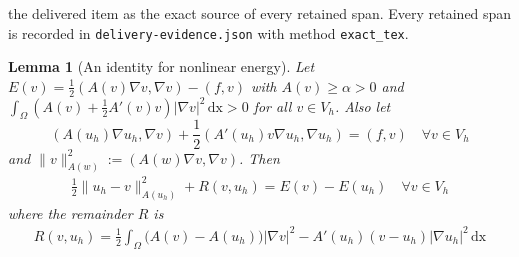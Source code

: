 \documentclass[10pt,a4paper]{amsart}
\theoremstyle{plain}
\newtheorem{lem}{Lemma}
\theoremstyle{definition}
\theoremstyle{remark}
\newcommand{\dx}{\,\text{dx}}
\begin{document}
the delivered item as the exact source of every retained span. Every retained span is recorded in \texttt{delivery-evidence.json} with method \texttt{exact\_tex}.
\begin{lem}[An identity for nonlinear energy]\label{lem:nonlinenergyident}
Let $E(v) = \frac{1}{2}(A(v) \nabla v,\nabla v) - (f, v)$ with $A(v) \geq \alpha > 0$ and $\int_{\Omega} (A(v) + \frac{1}{2}A'(v)v) |\nabla v|^2 \dx > 0$ for all $v \in V_h$. Also let
\begin{equation}
(A(u_h) \nabla u_h, \nabla v) + \frac{1}{2}(A'(u_h)v \nabla u_h, \nabla u_h) = (f, v) \quad \forall v \in V_h \label{nlei_vf}
\end{equation}
and $\| v \|_{A(w)}^2 := (A(w) \nabla v, \nabla v)$. Then
	\begin{align}
	\boxed{
		\frac{1}{2}\| u_h - v \|_{A(u_h)}^2 + R(v, u_h) = E(v) - E(u_{h}) \quad \forall v \in V_h \label{nlei_mainres}
		}
	\end{align}
	where the remainder $R$ is
	\begin{align}
	R(v, u_h) = \frac{1}{2} \int_{\Omega} \big(A(v) - A(u_h)\big) | \nabla v |^2 - A'(u_h) (v - u_h) | \nabla u_h |^2 \dx \label{nlei_remainder}
	\end{align}


\end{lem}
\end{document}
